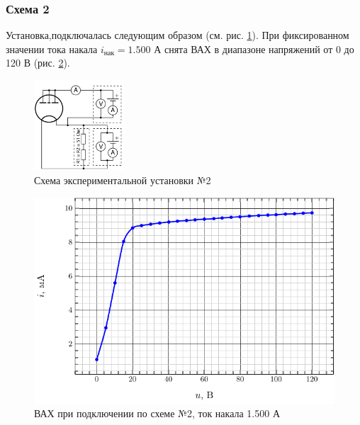 \documentclass[a5paper,11pt]{extarticle}
\begin{document}
\newpage
\subsubsection{Схема 2}
Установка,подключалась следующим образом (см. рис. \ref{fig:chem2}). При фиксированном значении тока накала $i_\text{нак}=1.500$ А снята ВАХ в диапазоне напряжений от 0 до 120 В (рис. \ref{fig:vax2}).
\begin{figure}[H]
	\centering
	\includegraphics[width=0.3\textwidth]{img/z2.jpg}
	\vspace{-1em}
	\caption{Схема экспериментальной установки №2}
	\label{fig:chem2}
\end{figure}

\begin{figure}[H]
	\centering
	\includegraphics[]{fig/i_from_u_2.pdf}
	\vspace{-1em}
	\caption{ВАХ при подключении по схеме №2, ток накала 1.500 А}
	\label{fig:vax2}
\end{figure}
\end{document}
